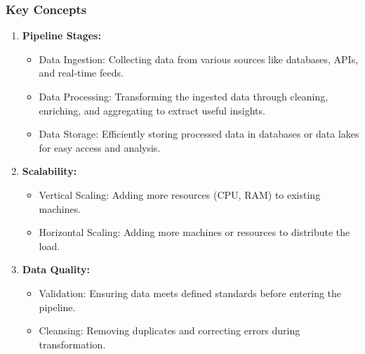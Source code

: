 \documentclass{beamer}
\begin{document}
\begin{frame}[fragile]
    \frametitle{Key Concepts}
    \begin{enumerate}
        \item \textbf{Pipeline Stages:}
            \begin{itemize}
                \item Data Ingestion: Collecting data from various sources like databases, APIs, and real-time feeds. 
                \item Data Processing: Transforming the ingested data through cleaning, enriching, and aggregating to extract useful insights.
                \item Data Storage: Efficiently storing processed data in databases or data lakes for easy access and analysis.
            \end{itemize}
        
        \item \textbf{Scalability:}
            \begin{itemize}
                \item Vertical Scaling: Adding more resources (CPU, RAM) to existing machines.
                \item Horizontal Scaling: Adding more machines or resources to distribute the load.
            \end{itemize}

        \item \textbf{Data Quality:}
            \begin{itemize}
                \item Validation: Ensuring data meets defined standards before entering the pipeline.
                \item Cleansing: Removing duplicates and correcting errors during transformation.
            \end{itemize}
    \end{enumerate}
\end{frame}
\end{document}
